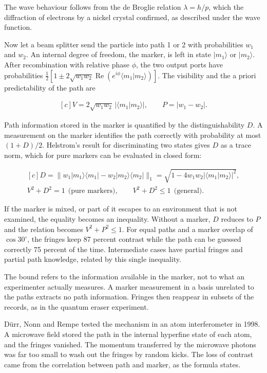 \documentclass[11pt,oneside]{book}
\newenvironment{centeredalign}{\[\begin{gathered}[c]}{\end{gathered}\]}
\begin{document}
The wave behaviour follows from the de Broglie relation \(\lambda=h/p\), which the diffraction of electrons by a nickel crystal confirmed, as described under the wave function.

Now let a beam splitter send the particle into path 1 or 2 with probabilities \(w_1\) and \(w_2\). An internal degree of freedom, the marker, is left in state \(|m_1\rangle\) or \(|m_2\rangle\). After recombination with relative phase \(\phi\), the two output ports have probabilities \(\frac12[1\pm2\sqrt{w_1w_2}\operatorname{Re}(e^{i\phi}\langle m_1|m_2\rangle)]\). The visibility and the a priori predictability of the path are

\begin{centeredalign}
V=2\sqrt{w_1w_2}\,|\langle m_1|m_2\rangle|,\qquad P=|w_1-w_2|.
\end{centeredalign}

Path information stored in the marker is quantified by the distinguishability \(D\). A measurement on the marker identifies the path correctly with probability at most \((1+D)/2\). Helstrom's result for discriminating two states gives \(D\) as a trace norm, which for pure markers can be evaluated in closed form:

\begin{centeredalign}
D=\big\|w_1|m_1\rangle\langle m_1|-w_2|m_2\rangle\langle m_2|\big\|_1
=\sqrt{1-4w_1w_2|\langle m_1|m_2\rangle|^2},\\
V^2+D^2=1\ \ \text{(pure markers)},\qquad V^2+D^2\leq1\ \ \text{(general)}.
\end{centeredalign}

If the marker is mixed, or part of it escapes to an environment that is not examined, the equality becomes an inequality. Without a marker, \(D\) reduces to \(P\) and the relation becomes \(V^2+P^2\leq1\). For equal paths and a marker overlap of \(\cos30^\circ\), the fringes keep 87 percent contrast while the path can be guessed correctly 75 percent of the time. Intermediate cases have partial fringes and partial path knowledge, related by this single inequality.

The bound refers to the information available in the marker, not to what an experimenter actually measures. A marker measurement in a basis unrelated to the paths extracts no path information. Fringes then reappear in subsets of the records, as in the quantum eraser experiment.

Dürr, Nonn and Rempe tested the mechanism in an atom interferometer in 1998. A microwave field stored the path in the internal hyperfine state of each atom, and the fringes vanished. The momentum transferred by the microwave photons was far too small to wash out the fringes by random kicks. The loss of contrast came from the correlation between path and marker, as the formula states.
\end{document}
